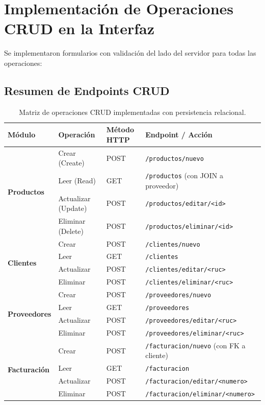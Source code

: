 \documentclass[11pt,a4paper]{article}
\begin{document}
\section{Implementación de Operaciones CRUD en la Interfaz}

Se implementaron formularios con validación del lado del servidor para todas las operaciones:

\subsection{Resumen de Endpoints CRUD}
\begin{table}[htbp]
\centering
\small
\begin{tabular}{@{}llll@{}}
\toprule
\textbf{Módulo} & \textbf{Operación} & \textbf{Método HTTP} & \textbf{Endpoint / Acción} \\
\midrule
\multirow{4}{*}{\textbf{Productos}} 
 & Crear (Create) & POST & \texttt{/productos/nuevo} \\
 & Leer (Read) & GET & \texttt{/productos} (con JOIN a proveedor) \\
 & Actualizar (Update) & POST & \texttt{/productos/editar/<id>} \\
 & Eliminar (Delete) & POST & \texttt{/productos/eliminar/<id>} \\
\midrule
\multirow{4}{*}{\textbf{Clientes}} 
 & Crear & POST & \texttt{/clientes/nuevo} \\
 & Leer & GET & \texttt{/clientes} \\
 & Actualizar & POST & \texttt{/clientes/editar/<ruc>} \\
 & Eliminar & POST & \texttt{/clientes/eliminar/<ruc>} \\
\midrule
\multirow{4}{*}{\textbf{Proveedores}} 
 & Crear & POST & \texttt{/proveedores/nuevo} \\
 & Leer & GET & \texttt{/proveedores} \\
 & Actualizar & POST & \texttt{/proveedores/editar/<ruc>} \\
 & Eliminar & POST & \texttt{/proveedores/eliminar/<ruc>} \\
\midrule
\multirow{4}{*}{\textbf{Facturación}} 
 & Crear & POST & \texttt{/facturacion/nuevo} (con FK a cliente) \\
 & Leer & GET & \texttt{/facturacion} \\
 & Actualizar & POST & \texttt{/facturacion/editar/<numero>} \\
 & Eliminar & POST & \texttt{/facturacion/eliminar/<numero>} \\
\bottomrule
\end{tabular}
\caption{Matriz de operaciones CRUD implementadas con persistencia relacional.}
\end{table}
\end{document}
